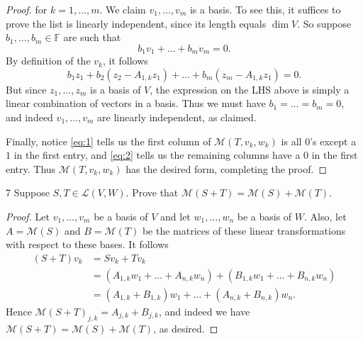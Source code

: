\documentclass{extarticle}
\newenvironment{problem}[1]{\begin{prob*}{#1}{}}{\end{prob*}}
\newcommand{\F}{\mathbb{F}}
\newcommand{\mat}{\mathcal{M}}
\newcommand{\Hom}{\mathcal{L}}
\begin{document}
\begin{proof}
for $k = 1,\dots, m$.  We claim $v_1,\dots,v_m$ is a basis.  To see this, it suffices to prove the list is linearly independent, since its length equals $\dim V$.  So suppose $b_1,\dots, b_m\in\F$ are such that
\begin{equation*}
b_1v_1 + \dots + b_mv_m = 0.
\end{equation*}
By definition of the $v_k$, it follows
\begin{equation*}
b_1z_1 +  b_2(z_2 - A_{1,k}z_1) + \dots + b_m(z_m - A_{1,k}z_1 ) = 0.
\end{equation*}
But since $z_1,\dots, z_m$ is a basis of $V$, the expression on the LHS above is simply a linear combination of vectors in a basis.  Thus we must have $b_1=\dots=b_m=0$, and indeed $v_1,\dots, v_m$ are linearly independent, as claimed.
\par Finally, notice \eqref{eq:1} tells us the first column of $\mat(T, v_k, w_k)$ is all $0$'s except a $1$ in the first entry, and \eqref{eq:2} tells us the remaining columns have a $0$ in the first entry.  Thus $\mat(T, v_k, w_k)$ has the desired form, completing the proof.
\end{proof}

\begin{problem}{7}
Suppose $S,T\in\Hom(V,W)$.  Prove that $\mat(S+T) = \mat(S) + \mat(T)$.  
\end{problem}
\begin{proof}
Let $v_1,\dots, v_m$ be a basis of $V$ and let $w_1,\dots, w_n$ be a basis of $W$.  Also, let $A = \mat(S)$ and $B =\mat(T)$ be the matrices of these linear transformations with respect to these bases.  It follows
\begin{align*}
(S + T)v_k &= Sv_k + Tv_k\\
&= \left(A_{1, k}w_1 + \dots + A_{n,k}w_n\right) + \left(B_{1, k}w_1 + \dots + B_{n,k}w_n\right) \\
&= (A_{1, k} + B_{1,k})w_1 + \dots + (A_{n,k} + B_{n,k})w_n.
\end{align*}
Hence $\mat(S + T)_{j,k}=A_{j,k} + B_{j,k}$, and indeed we have $\mat(S+T) = \mat(S) + \mat(T)$, as desired.
\end{proof}
\end{document}
